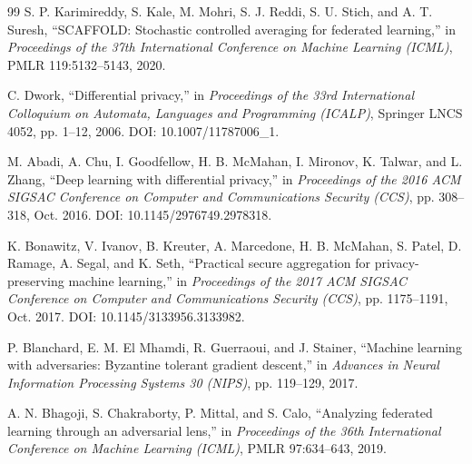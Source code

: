 \documentclass[11pt,a4paper]{article}
\begin{document}
\begin{thebibliography}{99}
 S. P. Karimireddy, S. Kale, M. Mohri, S. J. Reddi, S. U. Stich, and A. T. Suresh, ``SCAFFOLD: Stochastic controlled averaging for federated learning,'' in \textit{Proceedings of the 37th International Conference on Machine Learning (ICML)}, PMLR 119:5132–5143, 2020.

 C. Dwork, ``Differential privacy,'' in \textit{Proceedings of the 33rd International Colloquium on Automata, Languages and Programming (ICALP)}, Springer LNCS 4052, pp. 1–12, 2006. DOI: 10.1007/11787006\_1.

 M. Abadi, A. Chu, I. Goodfellow, H. B. McMahan, I. Mironov, K. Talwar, and L. Zhang, ``Deep learning with differential privacy,'' in \textit{Proceedings of the 2016 ACM SIGSAC Conference on Computer and Communications Security (CCS)}, pp. 308–318, Oct. 2016. DOI: 10.1145/2976749.2978318.

 K. Bonawitz, V. Ivanov, B. Kreuter, A. Marcedone, H. B. McMahan, S. Patel, D. Ramage, A. Segal, and K. Seth, ``Practical secure aggregation for privacy-preserving machine learning,'' in \textit{Proceedings of the 2017 ACM SIGSAC Conference on Computer and Communications Security (CCS)}, pp. 1175–1191, Oct. 2017. DOI: 10.1145/3133956.3133982.

 P. Blanchard, E. M. El Mhamdi, R. Guerraoui, and J. Stainer, ``Machine learning with adversaries: Byzantine tolerant gradient descent,'' in \textit{Advances in Neural Information Processing Systems 30 (NIPS)}, pp. 119–129, 2017.

 A. N. Bhagoji, S. Chakraborty, P. Mittal, and S. Calo, ``Analyzing federated learning through an adversarial lens,'' in \textit{Proceedings of the 36th International Conference on Machine Learning (ICML)}, PMLR 97:634–643, 2019.

\end{thebibliography}
\end{document}
